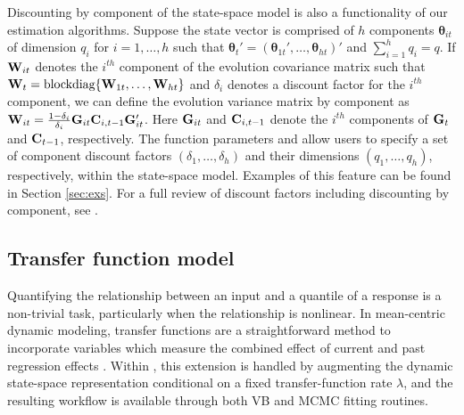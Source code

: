 \documentclass[jss]{jss}
\begin{document}
Discounting by component of the state-space model is also a functionality of our estimation algorithms. Suppose the state vector is comprised of $h$ components $\boldsymbol{\theta}_{it}$ of dimension $q_i$ for $i=1,\dots,h$ such that $\boldsymbol{\theta}_{t}' = (\boldsymbol{\theta}_{1t}',\dots,\boldsymbol{\theta}_{ht})'$ and $\sum_{i=1}^{h} q_i = q$. If ${\bf W}_{it}$ denotes the $i^{th}$ component of the evolution covariance matrix such that ${\bf W}_t = \text{blockdiag}\{ {\bf W}_{1t},\dots,{\bf W}_{ht}\}$ and $\delta_i$ denotes a discount factor for the $i^{th}$ component, we can define the evolution variance matrix by component as ${\bf W}_{it} = \frac{1-\delta_i}{\delta_i} {\bf G}_{it} {\bf C}_{i,t-1} {\bf G}_{it}'$. Here ${\bf G}_{it}$ and ${\bf C}_{i,t-1}$ denote the $i^{th}$ components of ${\bf G}_t$ and ${\bf C}_{t-1}$, respectively. The function parameters  and  allow users to specify a set of component discount factors $(\delta_1,\dots,\delta_h)$ and their dimensions $(q_1,\dots,q_h)$, respectively, within the state-space model. Examples of this feature can be found in Section \ref{sec:exs}. For a full review of discount factors including discounting by component, see \cite{west1985dynamic}.


\subsection{Transfer function model}
\label{sec:tf}

Quantifying the relationship between an input and a quantile of a response is a non-trivial task, particularly when the relationship is nonlinear. In mean-centric dynamic modeling, transfer functions are a straightforward method to incorporate variables which measure the combined effect of current and past regression effects \citep{west1985dynamic}. Within , this extension is handled by augmenting the dynamic state-space representation conditional on a fixed transfer-function rate \(\lambda\), and the resulting workflow is available through both VB and MCMC fitting routines.
\end{document}
